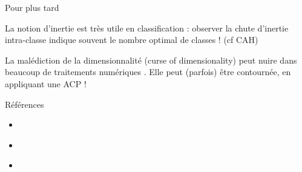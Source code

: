 \documentclass{beamer}
\begin{document}
\begin{frame}{Pour plus tard}


La notion d'\alert{inertie} est très utile en classification : observer la chute d'inertie intra-classe indique souvent le nombre optimal de classes ! (cf CAH)



La \alert{malédiction de la dimensionnalité} (curse of dimensionality) peut nuire dans beaucoup de traitements numériques . Elle peut (parfois) être contournée, en appliquant une ACP !




\end{frame}




\begin{frame}{Références }


\begin{itemize}
\item \href{http://www.sthda.com/french/articles/38-methodes-des-composantes-principales-dans-r-guide-pratique/73-acp-analyse-en-composantes-principales-avec-r-l-essentiel}{\color{cyan}{Page ACP STDHA}}
\item \href{https://gitlab.huma-num.fr/hcommenges/cours_statcomplet}{\color{cyan}{Cours d'Hadrien Commenges}}
\item \href{https://www.youtube.com/watch?v=8qw0bNfK4H0}{\color{cyan}{Cours vidéo de François Husson}}

\end{itemize}


\end{frame}

\end{document}
